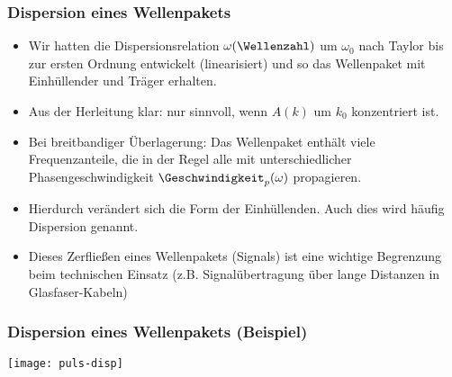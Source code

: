  \begin{frame}
  \frametitle{Dispersion eines Wellenpakets}
      \begin{itemize}[<+->]
      \item Wir hatten die Dispersionsrelation \(\omega(\Wellenzahl)\) um \(\omega_0\) nach Taylor bis zur ersten Ordnung entwickelt (\alert{linearisiert}) und so das Wellenpaket mit Einhüllender und Träger erhalten.
        \item Aus der Herleitung klar: nur sinnvoll, wenn \(A(k)\) um \(k_0\) \alert{konzentriert} ist.
        \item Bei breitbandiger Überlagerung: Das Wellenpaket enthält viele Frequenzanteile, die in der Regel alle mit \alert{unterschiedlicher Phasengeschwindigkeit} \(\Geschwindigkeit_p(\omega)\) propagieren.
        \item Hierdurch verändert sich die Form der Einhüllenden. Auch dies wird häufig \alert{Dispersion} genannt.
          \item Dieses \alert{Zerfließen} eines Wellenpakets (Signals) ist eine wichtige Begrenzung beim technischen Einsatz (z.B. Signalübertragung über lange Distanzen in Glasfaser-Kabeln)
 \end{itemize}
  \end{frame}

 \begin{frame}
   \frametitle{Dispersion eines Wellenpakets (Beispiel)}
   \centering
   \texttt{[image: puls-disp]}
  \end{frame}



   
